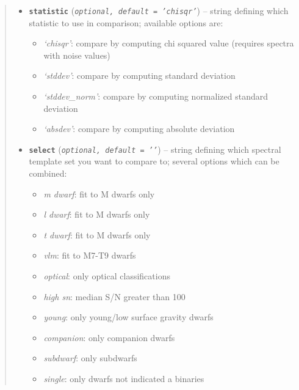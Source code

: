 \documentclass[letterpaper,10pt,english]{sphinxmanual}
\begin{document}
\begin{fulllineitems}
\begin{quote}
\begin{description}
\begin{itemize}
\item {} 
\textbf{\texttt{statistic}} (\emph{\texttt{optional, default = 'chisqr'}}) -- 
string defining which statistic to use in comparison; available options are:
\begin{itemize}
\item {} 
\emph{`chisqr'}: compare by computing chi squared value (requires spectra with noise values)

\item {} 
\emph{`stddev'}: compare by computing standard deviation

\item {} 
\emph{`stddev\_norm'}: compare by computing normalized standard deviation

\item {} 
\emph{`absdev'}: compare by computing absolute deviation

\end{itemize}


\item {} 
\textbf{\texttt{select}} (\emph{\texttt{optional, default = '{'}}}) -- 
string defining which spectral template set you want to compare to; several options which can be combined:
\begin{itemize}
\item {} 
\emph{m dwarf}: fit to M dwarfs only

\item {} 
\emph{l dwarf}: fit to M dwarfs only

\item {} 
\emph{t dwarf}: fit to M dwarfs only

\item {} 
\emph{vlm}: fit to M7-T9 dwarfs

\item {} 
\emph{optical}: only optical classifications

\item {} 
\emph{high sn}: median S/N greater than 100

\item {} 
\emph{young}: only young/low surface gravity dwarfs

\item {} 
\emph{companion}: only companion dwarfs

\item {} 
\emph{subdwarf}: only subdwarfs

\item {} 
\emph{single}: only dwarfs not indicated a binaries


\end{itemize}
\end{itemize}
\end{description}
\end{quote}
\end{fulllineitems}
\end{document}
